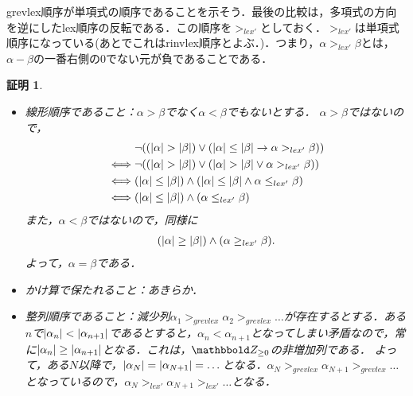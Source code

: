\documentclass[9pt]{ltjsarticle}
\theoremstyle{break}
\theoremstyle{break}
\theoremstyle{break}
\theoremstyle{break}
\theoremstyle{break}
\theoremstyle{break}
\theoremstyle{break}
\theoremstyle{break}
\theoremstyle{break}
\theoremstyle{break}
\theoremstyle{break}
\theoremstyle{break}
\theoremstyle{break}
\theoremstyle{break}
\theoremstyle{break}
\theoremstyle{nonumberbreak}
\newtheorem{myproof}{証明}
\theoremstyle{nonumberbreak}
\begin{document}
grevlex順序が単項式の順序であることを示そう．最後の比較は，多項式の方向を逆にしたlex順序の反転である．この順序を$>_{lex'}$としておく．$>_{lex'}$は単項式順序になっている(あとでこれはrinvlex順序とよぶ．)．つまり，$\alpha >_{lex'} \beta$とは，$\alpha-\beta$の一番右側の0でない元が負であることである．
\begin{myproof}
 \begin{itemize}
  \item 線形順序であること：$\alpha > \beta$でなく$\alpha < \beta$でもないとする．
$\alpha > \beta$ではないので，
\begin{align}
& \neg((\myabs{\alpha} > \myabs{\beta}) \lor (\myabs{\alpha}\le \myabs{\beta} \rightarrow \alpha >_{lex'} \beta))\\
 \iff&
 \neg((\myabs{\alpha} > \myabs{\beta}) \lor (\myabs{\alpha}> \myabs{\beta} \lor \alpha >_{lex'} \beta))\\
\iff &
 (\myabs{\alpha} \le \myabs{\beta}) \land (\myabs{\alpha}\le \myabs{\beta} \land \alpha \le_{lex'} \beta)\\
 \iff&
(\myabs{\alpha} \le \myabs{\beta}) \land (\alpha \le_{lex'} \beta)
\end{align}
また，$\alpha < \beta$ではないので，同様に
\begin{align}
 (\left|\alpha\right|\ge \left|\beta\right|) \land (\alpha \ge_{lex'} \beta).
\end{align}
よって，$\alpha = \beta$である．
  \item かけ算で保たれること：あきらか．
  \item 整列順序であること：減少列$\alpha_1 >_{grevlex} \alpha_2 >_{grevlex} \dots$が存在するとする．ある$n$で$\left|\alpha_n\right| < \left|\alpha_{n+1}\right|$であるとすると，$\alpha_n < \alpha_{n+1}$となってしまい矛盾なので，常に$\left|\alpha_n\right| \ge \left|\alpha_{n+1}\right|$となる．これは，$\Zge$の非増加列である．
よって，ある$N$以降で，$\left|\alpha_N\right| = \left|\alpha_{N+1}\right| = \dots $となる．$\alpha_N >_{grevlex} \alpha_{N+1}>_{grevlex} \dots$となっているので，$\alpha_N >_{lex'} \alpha_{N+1} >_{lex'}\dots$となる．
 \end{itemize}
\end{myproof}
\end{document}
